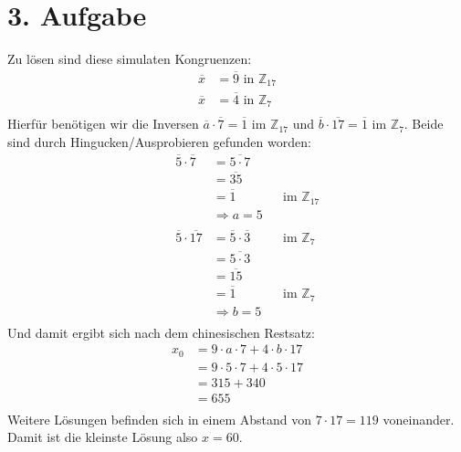 \documentclass[]{article}
\newcommand{\T}[1]{\overline{#1}}
\newcommand{\rarr}{\Rightarrow}
\begin{document}
\newpage
\section*{3. Aufgabe}
Zu lösen sind diese simulaten Kongruenzen:
\begin{align*}
	&& \T{x}&= \T{9} \text{ in } \mathbb{Z}_{17} &&\\
	&& \T{x}&= \T{4} \text{ in } \mathbb{Z}_{7} &&\\
\end{align*}
Hierfür benötigen wir die Inversen $\T{a} \cdot \T{7} = \T{1}$ im $\mathbb{Z}_{17}$ und $\T{b} \cdot \T{17} = \T{1}$ im $\mathbb{Z}_{7}$. Beide sind durch Hingucken/Ausprobieren gefunden worden:
\begin{align*}
	&& \T{5} \cdot \T{7}&= \T{5 \cdot 7} &&\\
	&& &= \T{35} &&\\
	&& &= \T{1} &&\text{im } \mathbb{Z}_{17}\\
	&& &\rarr a = 5&&\\
	\\
	&& \T{5} \cdot \T{17}&= \T{5} \cdot \T{3} &&\text{im } \mathbb{Z}_{7}\\
	&& &= \T{5 \cdot 3} &&\\
	&& &= \T{15} &&\\
	&& &= \T{1} &&\text{im } \mathbb{Z}_{7}\\
	&& &\rarr b = 5&&\\
\end{align*}
Und damit ergibt sich nach dem chinesischen Restsatz:
\begin{align*}
	&& x_0&= 9 \cdot a \cdot 7 + 4 \cdot b \cdot 17 &&\\
	&& &= 9 \cdot 5 \cdot 7 + 4 \cdot 5 \cdot 17 &&\\
	&& &= 315 + 340 &&\\
	&& &= 655 &&\\
\end{align*}
Weitere Lösungen befinden sich in einem Abstand von $7 \cdot 17 = 119$ voneinander. Damit ist die kleinste Lösung also $x = 60$.

\newpage
\end{document}
